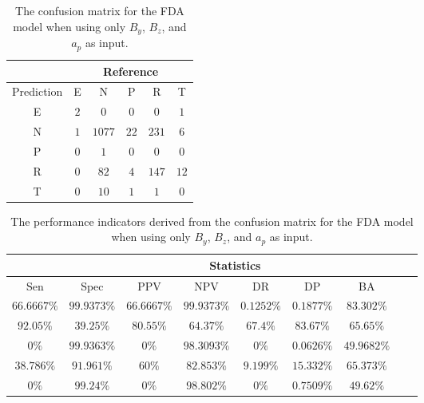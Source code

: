 \begin{table}[!ht]
	\centering
	\begin{tabular}{|c|c|c|c|c|c|}
		\hline
		 & \multicolumn{5}{|c|}{Reference} \\ \hline
		 Prediction & E & N & P & R & T \\ \hline
		 E & $2$ & $0$ & $0$ & $0$ & $1$ \\ \hline
		 N & $1$ & $1077$ & $22$ & $231$ & $6$ \\ \hline
		 P & $0$ & $1$ & $0$ & $0$ & $0$ \\ \hline
		 R & $0$ & $82$ & $4$ & $147$ & $12$ \\ \hline
		 T & $0$ & $10$ & $1$ & $1$ & $0$ \\ \hline
	\end{tabular}
	\caption{The confusion matrix for the FDA model when using only $B_{y}$, $B_{z}$, and $a_{p}$ as input.}
	\label{tab:cm:yzap:fda}
\end{table}

\begin{table}[!ht]
	\centering
	\begin{tabular}{|c|c|c|c|c|c|c|c|c|}
		\hline
		 & \multicolumn{7}{c|}{Statistics} \\ \hline
		Sen & Spec & PPV & NPV & DR & DP & BA \\ \hline
		$66.6667\%$ & $99.9373\%$ & $66.6667\%$ & $99.9373\%$ & $0.1252\%$ & $0.1877\%$ & $83.302\%$ \\ \hline
		$92.05\%$ & $39.25\%$ & $80.55\%$ & $64.37\%$ & $67.4\%$ & $83.67\%$ & $65.65\%$ \\ \hline
		$0\%$ & $99.9363\%$ & $0\%$ & $98.3093\%$ & $0\%$ & $0.0626\%$ & $49.9682\%$ \\ \hline
		$38.786\%$ & $91.961\%$ & $60\%$ & $82.853\%$ & $9.199\%$ & $15.332\%$ & $65.373\%$ \\ \hline
		$0\%$ & $99.24\%$ & $0\%$ & $98.802\%$ & $0\%$ & $0.7509\%$ & $49.62\%$ \\ \hline
	\end{tabular}
	\caption{The performance indicators derived from the confusion matrix for the FDA model when using only $B_{y}$, $B_{z}$, and $a_{p}$ as input.}
	\label{tab:cs:yzap:fda}
\end{table}
